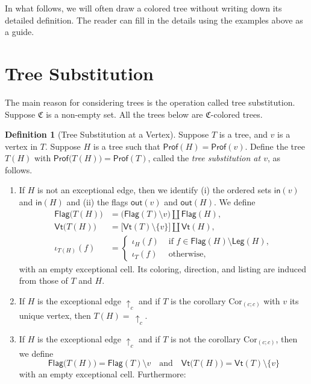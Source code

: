 \documentclass[11pt]{amsbook}
\numberwithin{section}{chapter}
\numberwithin{subsection}{section}
\numberwithin{equation}{section}
\theoremstyle{plain}
\theoremstyle{definition}
\newtheorem{definition}[equation]{Definition}
\newcommand{\colorc}{\mathfrak{C}}
\newcommand{\Cor}{\mathrm{Cor}}
\newcommand{\Flag}{\mathsf{Flag}}
\newcommand{\Leg}{\mathsf{Leg}}
\newcommand{\Prof}{\mathsf{Prof}}
\newcommand{\profofh}{\Prof(H)}
\newcommand{\profoft}{\Prof(T)}
\newcommand{\profofv}{\Prof(v)}
\newcommand{\Vt}{\mathsf{Vt}}
\newcommand{\inp}{\mathsf{in}}
\newcommand{\out}{\mathsf{out}}
\newcommand{\andspace}{\quad\text{and}\quad}
\begin{document}
In what follows, we will often draw a colored tree without writing down its detailed definition.  The reader can fill in the details using the examples above as a guide.

\section{Tree Substitution}\label{sec:tree-sub}

The main reason for considering trees is the operation called tree substitution.  Suppose $\colorc$ is a non-empty set.  All the trees below are $\colorc$-colored trees.

\begin{definition}[Tree Substitution at a Vertex]\label{def:tree-sub-vertex}
Suppose $T$ is a tree, and $v$ is a vertex in $T$.  Suppose $H$ is a tree such that $\profofh = \profofv$.  Define the tree $T(H)$ with $\Prof\bigl(T(H)\bigr) = \profoft$, called the \emph{tree substitution at $v$}, as follows.
\begin{enumerate}
\item If $H$ is not an exceptional edge, then we identify (i) the ordered sets $\inp(v)$ and $\inp(H)$ and (ii) the flags $\out(v)$ and $\out(H)$.  We define 
\[\begin{split}\Flag\bigl(T(H)\bigr) &= \bigl(\Flag(T) \setminus v\bigr) \coprod \Flag(H),\\
\Vt\bigl(T(H)\bigr) &= \bigl[\Vt(T) \setminus \{v\}\bigr] \coprod \Vt(H),\\
\iota_{T(H)}(f) &= \begin{cases} \iota_H(f) & \text{ if $f \in \Flag(H) \setminus \Leg(H)$},\\ \iota_T(f) & \text{ otherwise},\end{cases}
\end{split}\] with an empty exceptional cell.  Its coloring, direction, and listing are induced from those of $T$ and $H$.
\item If $H$ is the exceptional edge $\uparrow_c$ and if $T$ is the corollary $\Cor_{(c;c)}$ with $v$ its unique vertex, then $T(H) =\, \uparrow_c$.
\item If $H$ is the exceptional edge $\uparrow_c$ and if $T$ is not the corollary $\Cor_{(c;c)}$, then we define \[\Flag\bigl(T(H)\bigr)=\Flag(T) \setminus v \andspace 
\Vt\bigl(T(H)\bigr)=\Vt(T) \setminus \{v\}\] with an empty exceptional cell.  Furthermore: 
\begin{enumerate}

\end{enumerate}
\end{enumerate}
\end{definition}
\end{document}
